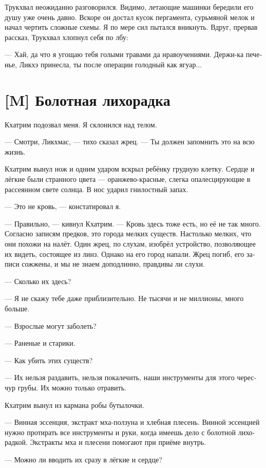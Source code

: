 \documentclass[a4paper,12pt,fleqn]{book}\usepackage{polyglossia}\setdefaultlanguage[babelshorthands=true]{russian}\setotherlanguage{english}\defaultfontfeatures{Ligatures=TeX,Mapping=tex-text}\usepackage{xcolor}\newcommand{\ml}[3]{#2}
\begin{document}
{Трукхвал неожиданно разговорился.
Видимо, летающие машинки бередили его душу уже очень давно.
Вскоре он достал кусок пергамента, сурьмяной мелок и начал чертить сложные схемы.
Я по мере сил пытался вникнуть.
Вдруг, прервав рассказ, Трукхвал хлопнул себя по лбу:

--- Хай, да что я угощаю тебя голыми травами да нравоучениями.
Держи-ка печенье, Ликхэ принесла, ты после операции голодный как ягуар...

\section{[M] Болотная лихорадка}

Кхатрим подозвал меня.
Я склонился над телом.

--- Смотри, Ликхмас, --- тихо сказал жрец.
--- Ты должен запомнить это на всю жизнь.

Кхатрим вынул нож и одним ударом вскрыл ребёнку грудную клетку.
Сердце и лёгкие были странного цвета --- оранжево-красные, слегка опалесцирующие в рассеянном свете солнца.
В нос ударил гнилостный запах.

--- Это не кровь, --- констатировал я.

--- Правильно, --- кивнул Кхатрим.
--- Кровь здесь тоже есть, но её не так много.
Согласно записям предков, это города мелких существ.
Настолько мелких, что они похожи на налёт.
Один жрец, по слухам, изобрёл устройство, позволяющее их видеть, состоящее из линз.
Однако на его город напали.
Жрец погиб, его записи сожжены, и мы не знаем доподлинно, правдивы ли слухи.

--- Сколько их здесь?

--- Я не скажу тебе даже приблизительно.
Не тысячи и не миллионы, много больше.

--- Взрослые могут заболеть?

--- Раненые и старики.

--- Как убить этих существ?

--- Их нельзя раздавить, нельзя покалечить, наши инструменты для этого чересчур грубы.
Их можно только отравить.

Кхатрим вынул из кармана робы бутылочки.

--- Винная эссенция, экстракт мха-ползуна и хлебная плесень.
Винной эссенцией нужно протирать все инструменты и руки, когда имеешь дело с болотной лихорадкой.
Экстракты мха и плесени помогают при приёме внутрь.

--- Можно ли вводить их сразу в лёгкие и сердце?

}
\end{document}
